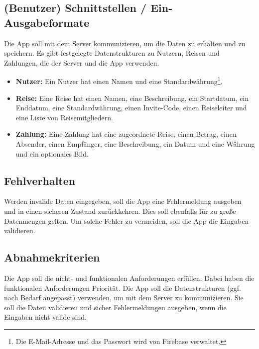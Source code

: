 \subsection{(Benutzer) Schnittstellen / Ein-Ausgabeformate}

Die App soll mit dem Server kommunizieren, um die Daten zu erhalten und zu speichern.
Es gibt festgelegte Datenstrukturen zu Nutzern, Reisen und Zahlungen, die der Server und die App verwenden.

\begin{itemize}
	\item \textbf{Nutzer:} Ein Nutzer hat einen Namen und eine Standardwährung\footnote{Die E-Mail-Adresse und das Passwort wird von Firebase verwaltet.}.
	\item \textbf{Reise:} Eine Reise hat einen Namen, eine Beschreibung, ein Startdatum, ein Enddatum, eine Standardwährung, einen Invite-Code, einen Reiseleiter und eine Liste von Reisemitgliedern.
	\item \textbf{Zahlung:} Eine Zahlung hat eine zugeordnete Reise, einen Betrag, einen Absender, einen Empfänger, eine Beschreibung, ein Datum und eine Währung und ein optionales Bild.
\end{itemize}

\subsection{Fehlverhalten}

Werden invalide Daten eingegeben, soll die App eine Fehlermeldung ausgeben und in einen sicheren Zustand zurückkehren.
Dies soll ebenfalls für zu große Datenmengen gelten.
Um solche Fehler zu vermeiden, soll die App die Eingaben validieren.

\subsection{Abnahmekriterien}

Die App soll die nicht- und funktionalen Anforderungen erfüllen.
Dabei haben die funktionalen Anforderungen Priorität.
Die App soll die Datenstrukturen (ggf. nach Bedarf angepasst) verwenden, um mit dem Server zu kommunizieren.
Sie soll die Daten validieren und sicher Fehlermeldungen ausgeben, wenn die Eingaben nicht valide sind.
